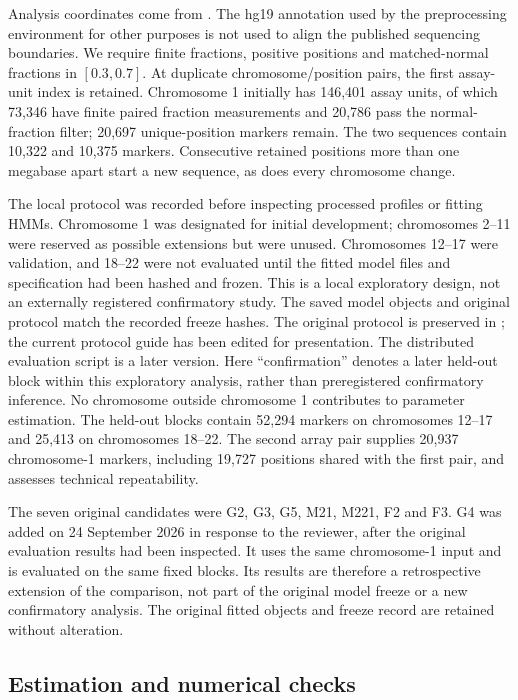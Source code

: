\documentclass[11pt]{article}
\begin{document}
Analysis coordinates come from
.
The hg19 annotation used by the preprocessing environment for other purposes
is not used to align the published sequencing boundaries. We require finite
fractions, positive positions and matched-normal fractions in $[0.3,0.7]$.
At duplicate chromosome/position pairs, the first assay-unit index is retained.
Chromosome 1 initially has 146,401 assay units, of which 73,346 have finite
paired fraction measurements and 20,786 pass the normal-fraction filter;
20,697 unique-position markers remain. The two sequences contain 10,322 and
10,375 markers. Consecutive retained positions more than one megabase apart
start a new sequence, as does every chromosome change.

The local protocol was recorded before inspecting processed profiles or
fitting HMMs. Chromosome 1 was designated for initial development;
chromosomes 2--11 were reserved as possible extensions but were unused.
Chromosomes 12--17 were validation, and 18--22 were not evaluated until the
fitted model files and specification had been hashed and frozen. This is a
local exploratory design, not an externally registered confirmatory study.
The saved model objects and original protocol match the recorded freeze
hashes. The original protocol is preserved in
; the current protocol
guide has been edited for presentation. The distributed evaluation script
is a later version. Here
``confirmation'' denotes a later held-out block within this exploratory
analysis, rather than preregistered confirmatory inference.
No chromosome outside chromosome 1 contributes to parameter estimation.
The held-out blocks contain 52,294 markers on chromosomes 12--17 and
25,413 on chromosomes 18--22. The second array pair supplies 20,937
chromosome-1 markers, including 19,727 positions shared with the first pair,
and assesses technical repeatability.

The seven original candidates were G2, G3, G5, M21, M221, F2 and F3.
G4 was added on 24 September 2026 in response to the reviewer, after the
original evaluation results had been inspected. It uses the same
chromosome-1 input and is evaluated on the same fixed blocks. Its results
are therefore a retrospective extension of the comparison, not part of the
original model freeze or a new confirmatory analysis. The original fitted
objects and freeze record are retained without alteration.

\subsection{Estimation and numerical checks}\label{sec:si-genomic-estimation}
\end{document}

